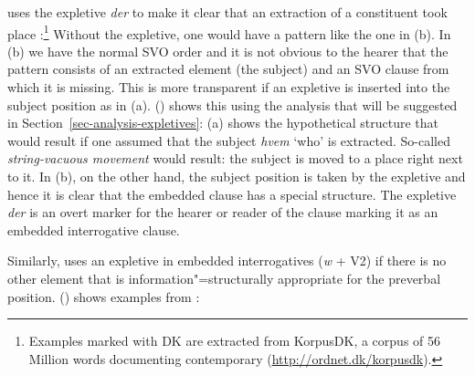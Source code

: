 \noindent
{} uses the expletive \emph{der} to make it clear that an extraction of a constituent took place
\citep[]{MOe2011a}:\footnote{
  Examples marked with DK are extracted from KorpusDK, a corpus of 56 Million words documenting
  contemporary  (\url{http://ordnet.dk/korpusdk}).
}
\eal
\label{ex-danish-interrogative-expletive}
\zl
Without the expletive, one would have a pattern like the one in (b). In (b) we have the
normal SVO order and it is not obvious to the hearer that the pattern consists of an extracted
element (the subject) and an SVO clause from which it is missing. This is more transparent if an
expletive is inserted into the subject position as in (a). () shows this using the
analysis that will be suggested in Section~\ref{sec-analysis-expletives}: (a) shows the hypothetical
structure that would result if one assumed that the subject \emph{hvem} `who' is
extracted. So-called \emph{string-vacuous movement} would result: the subject is moved to a place
right next to it. In (b), on the other hand, the subject position is taken by the expletive and
hence it is clear that the embedded clause has a special structure. The expletive \emph{der} is an overt marker for
the hearer or reader of the clause marking it as an embedded interrogative clause.
\eal
{}
\zl

Similarly,  uses an expletive in embedded interrogatives (\emph{w} + V2) if 
there is no other element that is information"=structurally appropriate for the preverbal position.
() shows examples from \citet[--404]{Prince89a}:

